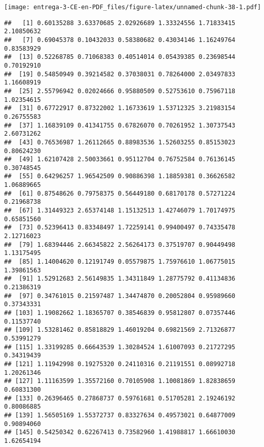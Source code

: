 \documentclass[
]{article}
\newenvironment{Shaded}{\begin{snugshade}}{\end{snugshade}}
\newcommand{\DataTypeTok}[1]{\textcolor[rgb]{0.13,0.29,0.53}{#1}}
\newcommand{\DecValTok}[1]{\textcolor[rgb]{0.00,0.00,0.81}{#1}}
\newcommand{\KeywordTok}[1]{\textcolor[rgb]{0.13,0.29,0.53}{\textbf{#1}}}
\newcommand{\NormalTok}[1]{#1}
\newcommand{\OperatorTok}[1]{\textcolor[rgb]{0.81,0.36,0.00}{\textbf{#1}}}
\newcommand{\StringTok}[1]{\textcolor[rgb]{0.31,0.60,0.02}{#1}}
\begin{document}
\texttt{[image: entrega-3-CE-en-PDF\_files/figure-latex/unnamed-chunk-38-1.pdf]}

\begin{Shaded}
\end{Shaded}

\begin{verbatim}
##   [1] 0.60135288 3.63370685 2.02926689 1.33324556 1.71833415 2.10850632
##   [7] 0.69045378 0.10432033 0.58380682 0.43034146 1.16249764 0.83583929
##  [13] 0.52268785 0.71068383 0.40514014 0.05439385 0.23698544 0.70192910
##  [19] 0.54850949 0.39214582 0.37038031 0.78264000 2.03497833 1.16608919
##  [25] 2.55796942 0.02024666 0.95880509 0.52753610 0.75967118 1.02354615
##  [31] 0.67722917 0.87322002 1.16733619 1.53712325 3.21983154 0.26755583
##  [37] 1.16839109 0.41341755 0.67826070 0.70261952 1.30737543 2.60731262
##  [43] 0.76536987 1.26112665 0.88983536 1.52603255 0.85153023 0.80624230
##  [49] 1.62107428 2.50033661 0.95112704 0.76752584 0.76136145 0.30748545
##  [55] 0.64296257 1.96542509 0.90886398 1.18859381 0.36626582 1.06889665
##  [61] 0.87548626 0.79758375 0.56449180 0.68170178 0.57271224 0.21968738
##  [67] 1.31449323 2.65374148 1.15132513 1.42746079 1.70174975 0.65851560
##  [73] 0.52396413 0.83348497 1.72259141 0.99400497 0.74335478 2.12716023
##  [79] 1.68394446 2.66345822 2.56264173 0.37519707 0.90449498 1.13175495
##  [85] 1.14004620 0.12191749 0.05579875 1.75976610 1.06775015 1.39861563
##  [91] 1.52912683 2.56149835 1.34311849 1.28775792 0.41134836 0.21386319
##  [97] 0.34761015 0.21597487 1.34474870 0.20052804 0.95989660 0.37343331
## [103] 1.19082662 1.18365707 0.38546839 0.95812807 0.07357446 0.11537740
## [109] 1.53281462 0.85818829 1.46019204 0.69821569 2.71326877 0.53991279
## [115] 1.33199285 0.66643539 1.30284524 1.61007093 0.21727295 0.34319439
## [121] 1.11942998 0.19275320 0.24110316 0.21191551 0.08992718 1.20261346
## [127] 1.11163599 1.35572160 0.70105908 1.10081869 1.82838659 0.60831300
## [133] 0.26396465 0.27868737 0.59761681 0.51705281 2.19246192 0.80086885
## [139] 1.56505169 1.55372737 0.83327634 0.49573021 0.64877009 0.90894060
## [145] 0.54250342 0.62267413 0.73582960 1.41988817 1.66610030 1.62654194

\end{verbatim}
\end{document}
